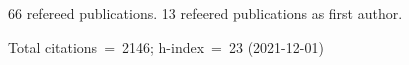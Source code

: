 66 refereed publications. 13 refeered publications as first author.

Total citations~=~2146; h-index~=~23 (2021-12-01)